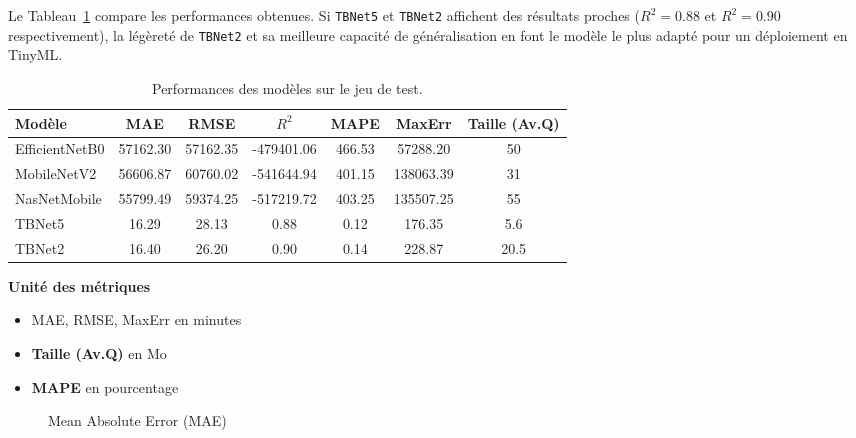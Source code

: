 Le Tableau~\ref{tab:metrics_comparison} compare les performances obtenues.
Si \texttt{TBNet5} et \texttt{TBNet2} affichent des résultats proches ($R^2 = 0.88$ et $R^2 = 0.90$ respectivement), la légèreté de \texttt{TBNet2} et sa meilleure capacité de généralisation en font le modèle le plus adapté pour un déploiement en TinyML.

\begin{table}[H]
	\centering
	\footnotesize
	\caption{Performances des modèles sur le jeu de test.}
	\label{tab:metrics_comparison}
	\begin{tabular}{|l|c|c|c|c|c|c|}
		\hline
		\small \textbf{Modèle} & \small \textbf{MAE} & \small \textbf{RMSE} & \small \textbf{$R^2$} & \small \textbf{MAPE} & \small \textbf{MaxErr} & \small \textbf{Taille (Av.Q)} \\
		\hline
		EfficientNetB0  & 57162.30           & 57162.35            & -479401.06     & 466.53             & 57288.20              & 50                               \\
		\hline
		MobileNetV2     & 56606.87           & 60760.02            & -541644.94     & 401.15             & 138063.39             & 31                               \\
		\hline
		NasNetMobile    & 55799.49           & 59374.25            & -517219.72     & 403.25             & 135507.25             & 55                               \\
		\hline
		TBNet5          & 16.29              & 28.13               & 0.88           & 0.12               & 176.35                & 5.6                              \\
		\hline
		TBNet2          & 16.40              & 26.20               & 0.90           & 0.14               & 228.87                & 20.5                             \\
		\hline
	\end{tabular}
\end{table}

\textbf{Unité des métriques}
\begin{itemize}
	\item MAE, RMSE, MaxErr en minutes
	\item \textbf{Taille (Av.Q)} en Mo
	\item \textbf{MAPE} en pourcentage
\end{itemize}

\begin{figure}[H]
	\centering
	\caption{Mean Absolute Error (MAE)}
\end{figure}


